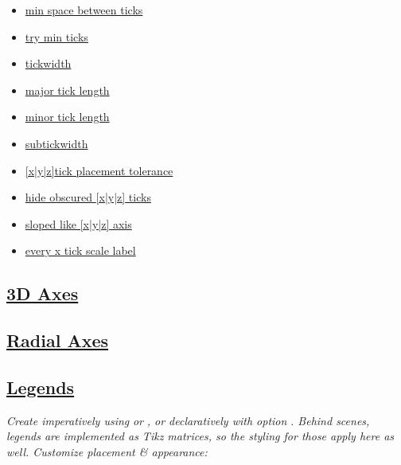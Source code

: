 \begin{multicols}{2}
{\begin{itemize}[leftmargin=1mm,label={}]
    \item \href{\docurl\#pgfp./pgfplots/min:space:between:ticks}{min space between ticks}
    \item \href{\docurl\#pgfp./pgfplots/try:min:ticks}{try min ticks}
    \item \href{\docurl\#pgfp./pgfplots/tickwidth}{tickwidth}
    \item \href{\docurl\#pgfp./pgfplots/major:tick:length}{major tick length}
    \item \href{\docurl\#pgfp./pgfplots/minor:tick:length}{minor tick length}
    \item \href{\docurl\#pgfp./pgfplots/subtickwidth}{subtickwidth}
    \item \href{\docurl\#pgfp./pgfplots/xtick:placement:tolerance}{{[x|y|z]}tick placement tolerance}
    \item \href{\docurl\#pgfp./pgfplots/hide:obscured:x:ticks}{{\footnotesize hide obscured {[x|y|z]} ticks}}
    \item \href{\docurl\#pgfp./tikz/sloped:like:y:axis}{sloped like [x|y|z] axis}
    \item \href{\docurl\#pgfp./pgfplots/every:x:tick:scale:label}{every x tick scale label}
\end{itemize}
}
\end{multicols}




\subsection*{\href{\docurl\#pgfp./pgfplots/view}{3D Axes}}




\subsection*{\href{\docurl\#pgfp.polar}{Radial Axes}}




\subsection*{\href{\docurl\#pgfp.back/addlegendentry}{Legends}}

\textit{Create imperatively using }\href{\docurl\#pgfp.back.addlegendentry}{}\textit{ or }\href{\docurl\#pgfp/back/legend}{}\textit{, or declaratively with option }\href{\docurl\#pgfp./pgfplots/legend:entries}{}\textit{. Behind scenes, legends are implemented as Tikz matrices, so the styling for those apply here as well. Customize placement \& appearance:}


